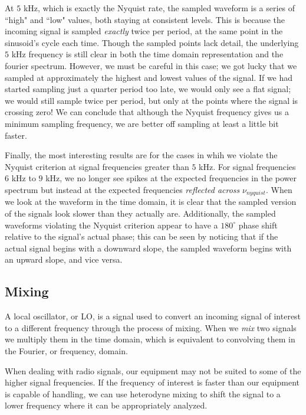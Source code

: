 \documentclass[12pt]{article}
\begin{document}
At $5$ kHz, which is exactly the Nyquist rate, the sampled waveform is a series of ``high" and ``low" values, both staying at consistent levels. This is because the incoming signal is sampled \textit{exactly} twice per period, at the same point in the sinusoid's cycle each time. Though the sampled points lack detail, the underlying $5$ kHz frequency is still clear in both the time domain representation and the fourier spectrum. However, we must be careful in this case; we got lucky that we sampled at approximately the highest and lowest values of the signal. If we had started sampling just a quarter period too late, we would only see a flat signal; we would still sample twice per period, but only at the points where the signal is crossing zero! We can conclude that although the Nyquist frequency gives us a minimum sampling frequency, we are better off sampling at least a little bit faster.

Finally, the most interesting results are for the cases in whih we violate the Nyquist criterion at signal frequencies greater than $5$ kHz. For signal frequencies $6$ kHz to $9$ kHz, we no longer see spikes at the expected frequencies in the power spectrum but instead at the expected frequencies \textit{reflected across} $\nu_{nyquist}$. When we look at the waveform in the time domain, it is clear that the sampled version of the signals look slower than they actually are.  Additionally, the sampled waveforms violating the Nyquist criterion appear to have a $180^\circ$ phase shift relative to the signal's actual phase; this can be seen by noticing that if the actual signal begins with a downward slope, the sampled waveform begins with an upward slope, and vice versa.

\subsection{Mixing} 

A local oscillator, or LO, is a signal used to convert an incoming signal of interest to a different frequency through the process of mixing. When we \textit{mix} two signals we multiply them in the time domain, which is equivalent to convolving them in the Fourier, or frequency, domain.

When dealing with radio signals, our equipment may not be suited to some of the higher signal frequencies. If the frequency of interest is faster than our equipment is capable of handling, we can use heterodyne mixing to shift the signal to a lower frequency where it can be appropriately analyzed.
\end{document}
